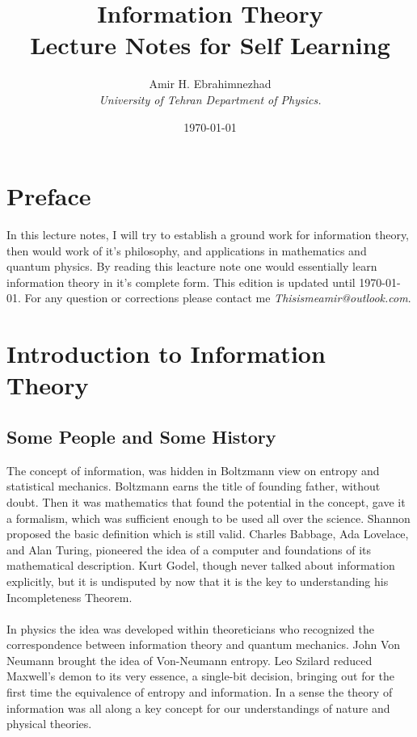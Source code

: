 \documentclass[9pt,a4paper, twocolumn]{article}
\title{Information Theory \\ \large Lecture Notes for Self Learning}
\date{\today}
\author{Amir H. Ebrahimnezhad \\ \small \textit{University of Tehran Department of Physics.}}
\newcounter{theo}
\begin{document}
    \maketitle
    \section*{Preface}
        In this lecture notes, I will try to establish a ground work for information theory, then would work of it's philosophy, and applications in mathematics and quantum physics. By reading this leacture note one would essentially learn information theory in it's complete form. This edition is updated until \today. For any question or corrections please contact me \textit{Thisismeamir@outlook.com}.
    \tableofcontents
    \newpage
    \section{Introduction to Information Theory}
        \subsection{Some People and Some History}
            The concept of information, was hidden in Boltzmann view on entropy and statistical mechanics. Boltzmann earns the title of founding father, without doubt. Then it was mathematics that found the potential in the concept, gave it a formalism, which was sufficient enough to be used all over the science. Shannon proposed the basic definition which is still valid. Charles Babbage, Ada Lovelace, and Alan Turing, pioneered the idea of a computer and foundations of its mathematical description. Kurt Godel, though never talked about information explicitly, but it is undisputed by now that it is the key to understanding his Incompleteness Theorem. 
            \\
            \\
            In physics the idea was developed within theoreticians who recognized the correspondence between information theory and quantum mechanics. John Von Neumann brought the idea of Von-Neumann entropy. Leo Szilard reduced Maxwell's demon to its very essence, a single-bit decision, bringing out for the first time the equivalence of entropy and information. In a sense the theory of information was all along a key concept for our understandings of nature and physical theories.
\end{document}
